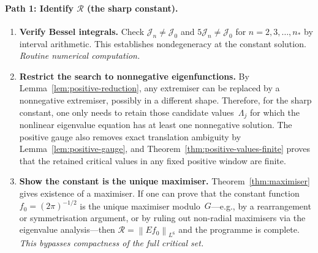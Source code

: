 \documentclass[12pt]{article}
\theoremstyle{definition}
\theoremstyle{remark}
\newcommand{\norm}[1]{\left\|#1\right\|}
\begin{document}
\paragraph{Path 1: Identify $\mathcal R$ (the sharp constant).}
\begin{enumerate}[leftmargin=2em]
  \item \textbf{Verify Bessel integrals.}  Check
    $\mathcal J_n\neq\mathcal J_0$ and $5\mathcal J_n\neq\mathcal J_0$
    for $n=2,3,\ldots,n_*$ by interval arithmetic.  This establishes
    nondegeneracy at the constant solution.  \emph{Routine numerical
    computation.}

  \item \textbf{Restrict the search to nonnegative eigenfunctions.}
    By Lemma~\ref{lem:positive-reduction}, any extremiser can be replaced
    by a nonnegative extremiser, possibly in a different shape.  Therefore,
    for the sharp constant, one only needs to retain those candidate
    values~$\Lambda_j$ for which the nonlinear eigenvalue equation has at
    least one nonnegative solution.  The positive gauge also removes exact
    translation ambiguity by Lemma~\ref{lem:positive-gauge}, and
    Theorem~\ref{thm:positive-values-finite} proves that the retained
    critical values in any fixed positive window are finite.

  \item \textbf{Show the constant is the unique maximiser.}
    Theorem~\ref{thm:maximiser} gives existence of a maximiser.
    If one can prove that the constant function $f_0=(2\pi)^{-1/2}$
    is the unique maximiser modulo~$G$---e.g., by a rearrangement
    or symmetrisation argument, or by ruling out non-radial
    maximisers via the eigenvalue analysis---then
    $\mathcal R=\norm{Ef_0}_{L^6}$ and the programme is complete.
    \emph{This bypasses compactness of the full critical set.}
\end{enumerate}
\end{document}
